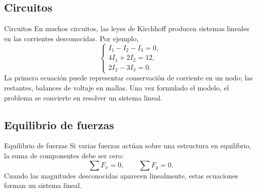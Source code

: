 \documentclass[aspectratio=169,11pt]{beamer}
\theoremstyle{remark}
\begin{document}
\subsection*{Circuitos}
\begin{frame}[allowframebreaks]{Circuitos}
\footnotesize
En muchos circuitos, las leyes de Kirchhoff producen sistemas lineales en las corrientes desconocidas.
Por ejemplo,
\[
\begin{cases}
I_1-I_2-I_3=0,\\
4I_1+2I_2=12,\\
2I_2-3I_3=0.
\end{cases}
\]
La primera ecuación puede representar conservación de corriente en un nodo; las restantes, balances de
voltaje en mallas. Una vez formulado el modelo, el problema se convierte en resolver un sistema lineal.
\end{frame}

\subsection*{Equilibrio de fuerzas}
\begin{frame}[allowframebreaks]{Equilibrio de fuerzas}
\footnotesize
Si varias fuerzas actúan sobre una estructura en equilibrio, la suma de componentes debe ser cero:
\[
\sum F_x=0,\qquad \sum F_y=0.
\]
Cuando las magnitudes desconocidas aparecen linealmente, estas ecuaciones forman un sistema lineal.
\end{frame}
\end{document}
